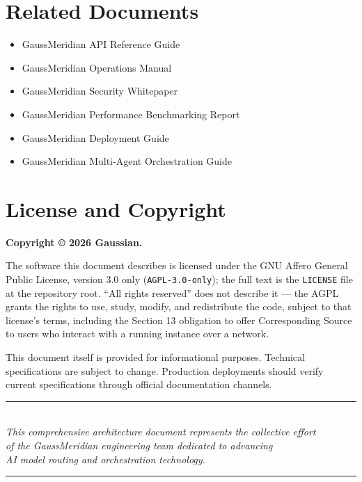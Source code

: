 \documentclass[12pt,a4paper,twoside]{report}
\begin{document}
\section*{Related Documents}

\begin{itemize}[leftmargin=*]
    \item GaussMeridian API Reference Guide
    \item GaussMeridian Operations Manual
    \item GaussMeridian Security Whitepaper
    \item GaussMeridian Performance Benchmarking Report
    \item GaussMeridian Deployment Guide
    \item GaussMeridian Multi-Agent Orchestration Guide
\end{itemize}

\section*{License and Copyright}

\textbf{Copyright © 2026 Gaussian.}

The software this document describes is licensed under the GNU Affero General Public License, version 3.0 only (\texttt{AGPL-3.0-only}); the full text is the \texttt{LICENSE} file at the repository root. ``All rights reserved'' does not describe it --- the AGPL grants the rights to use, study, modify, and redistribute the code, subject to that license's terms, including the Section 13 obligation to offer Corresponding Source to users who interact with a running instance over a network.

This document itself is provided for informational purposes. Technical specifications are subject to change. Production deployments should verify current specifications through official documentation channels.

\vfill

\begin{center}
\rule{0.8\textwidth}{0.4pt}\\[0.3cm]
{\footnotesize\itshape
This comprehensive architecture document represents the collective effort\\
of the GaussMeridian engineering team dedicated to advancing\\
AI model routing and orchestration technology.
}\\[0.2cm]
\rule{0.8\textwidth}{0.4pt}
\end{center}
\end{document}

